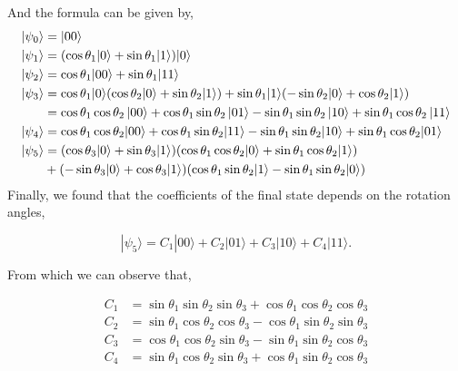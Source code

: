 \documentclass[11p]{article}
\begin{document}
And the formula can be given by,
\begin{align*}
|\psi_0\rangle &= |00 \rangle \\
|\psi_1\rangle &= (\cos\theta_1|0\rangle + \sin\theta_1|1\rangle)|0\rangle\\
|\psi_2\rangle & = \cos\theta_1|00\rangle + \sin\theta_1|11\rangle\\
|\psi_3\rangle &=\cos\theta_1|0\rangle(\cos\theta_2|0\rangle + \sin\theta_2|1\rangle) + \sin\theta_1|1\rangle(-\sin\theta_2|0\rangle + \cos\theta_2|1\rangle)\\
&=\cos\theta_1\cos\theta_2\ket{00}+\cos\theta_1\sin\theta_2\ket{01}-\sin\theta_1\sin\theta_2\ket{10}+\sin\theta_1\cos\theta_2\ket{11}\\
|\psi_4\rangle &=\cos\theta_1\cos\theta_2|00\rangle + \cos\theta_1\sin\theta_2|11\rangle- \sin\theta_1\sin\theta_2|10\rangle + \sin\theta_1\cos\theta_2|01\rangle\\
|\psi_5\rangle&=(\cos\theta_3|0\rangle + \sin\theta_3|1\rangle) 
(\cos\theta_1\cos\theta_2|0\rangle+\sin\theta_1\cos\theta_2|1\rangle)\\
&+(-\sin\theta_3|0\rangle + \cos\theta_3|1\rangle)
(\cos\theta_1\sin\theta_2|1\rangle- \sin\theta_1\sin\theta_2|0\rangle)
\end{align*}
Finally, we found that the coefficients of the final state depends on the rotation angles,

\[
    |\psi_5\rangle= C_1|00\rangle + C_2|01\rangle + C_3|10\rangle +C_4 |11\rangle.
\]

From which we can observe that,

\begin{align}
    C_1 &=     \sin\theta_1  \sin\theta_2  \sin\theta_3 +  \cos\theta_1 \cos\theta_2  \cos\theta_3\\
    C_2 &=   \sin\theta_1  \cos\theta_2 \cos\theta_3 -   \cos\theta_1 \sin\theta_2  \sin\theta_3   \\
    C_3 &=   \cos\theta_1  \cos\theta_2 \sin\theta_3 -  \sin\theta_1  \sin\theta_2  \cos\theta_3\\
    C_4 &=   \sin\theta_1  \cos\theta_2 \sin\theta_3  +    \cos\theta_1 \sin\theta_2 \cos\theta_3
\end{align}
\end{document}
